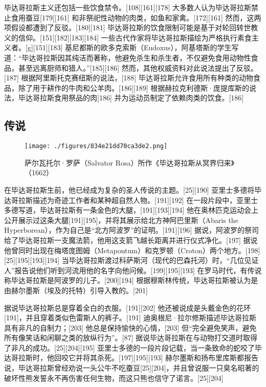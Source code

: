 毕达哥拉斯主义还包括一些饮食禁令。[108][161][178] 大多数人认为毕达哥拉斯禁止食用蚕豆[179][161] 和非祭祀性动物的肉类，如鱼和家禽。[172][161] 然而，这两项假设都遭到了反驳。[180][181] 毕达哥拉斯的饮食限制可能是基于对轮回转世教义的信仰。[151][182][183][184] 一些古代作家将毕达哥拉斯描绘为严格执行素食主义者。[g][151][183] 基尼都斯的欧多克索斯（Eudoxus），阿基塔斯的学生写道：“毕达哥拉斯因其纯洁而著称，他避免杀生和杀生者，不仅避免食用动物性食品，甚至远离厨师和猎人。”[185][186] 然而，其他权威资料对此说法提出了反驳。[187] 根据阿里斯托克赛纽斯的说法，[188] 毕达哥拉斯允许食用所有种类的动物食品，除了用于耕作的牛肉和公羊肉。[186][189] 根据赫拉克利德斯·庞提库斯的说法，毕达哥拉斯食用祭品的肉[186] 并为运动员制定了依赖肉类的饮食。[186]
\subsection{传说} 
\begin{figure}[ht]
\centering
\texttt{[image: ./figures/834e21dd70ca3de2.png]}
\caption{萨尔瓦托尔·罗萨（Salvator Rosa）所作《毕达哥拉斯从冥界归来》（1662）} \label{fig_Pythag_11}
\end{figure}
在毕达哥拉斯生前，他已经成为复杂的圣人传说的主题。[25][190] 亚里士多德将毕达哥拉斯描述为奇迹工作者和某种超自然人物。[191][192] 在一段片段中，亚里士多德写道，毕达哥拉斯有一条金色的大腿，[191][193][194] 他在奥林匹克运动会上公开展示过这条大腿[191][195]，并将其展示给北方神阿巴里斯（Abaris the Hyperborean），作为自己是“北方阿波罗”的证明。[191][196] 据说，阿波罗的祭司给了毕达哥拉斯一支魔法箭，他用这支箭飞越长距离并进行仪式净化。[197] 据说他曾同时出现在梅塔庞图姆（Metapontum）和克罗顿（Croton）两个地方。[198][25][195][193][194] 当毕达哥拉斯渡过科萨斯河（现代的巴森托河）时，“几位见证人”报告说他们听到河流用他的名字向他问候。[199][195][193] 在罗马时代，有传说称毕达哥拉斯是阿波罗的儿子。[200][194] 根据穆斯林传统，毕达哥拉斯被认为是由赫尔墨斯（埃及的托特）引导入教的。[201]

据说毕达哥拉斯总是穿着全白的衣服。[191][202] 他还被说成是头戴金色的花环[191]，并且穿着类似色雷斯人的裤子。[191] 迪奥根尼·拉尔修斯描述毕达哥拉斯具有非凡的自制力；[203] 他总是保持愉快的心情，[203] 但“完全避免笑声，避免所有像笑话和闲聊之类的放纵行为”。[87] 据说毕达哥拉斯在与动物打交道时取得了非凡的成功。[25][204][195] 亚里士多德的一段片段记载，当一条致命的蛇咬了毕达哥拉斯时，他回咬它并将其杀死。[197][195][193] 赫尔墨斯和扬布里库斯都报告说，毕达哥拉斯曾经劝说一头公牛不吃蚕豆[25][204]，并且曾说服一只臭名昭著的破坏性熊发誓永不再伤害任何生物，而这只熊也信守了诺言。[25][204]

